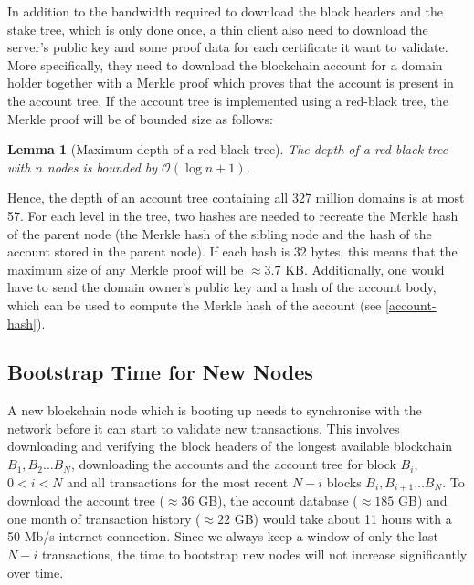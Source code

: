 \documentclass{style/kththesis}
\newtheorem{lemma}{Lemma}
\begin{document}
In addition to the bandwidth required to download the block headers and the stake tree, which is only done once, a thin client also need to download the server's public key and some proof data for each certificate it want to validate. More specifically, they need to download the blockchain account for a domain holder together with a Merkle proof which proves that the account is present in the account tree. If the account tree is implemented using a red-black tree, the Merkle proof will be of bounded size as follows: 

\begin{lemma}[Maximum depth of a red-black tree]
The depth of a red-black tree with $n$ nodes is bounded by $\mathcal{O}(\log n + 1)$.
\end{lemma}

Hence, the depth of an account tree containing all 327 million domains is at most 57. For each level in the tree, two hashes are needed to recreate the Merkle hash of the parent node (the Merkle hash of the sibling node and the hash of the account stored in the parent node). If each hash is 32 bytes, this means that the maximum size of any Merkle proof will be $\approx 3.7$ KB. Additionally, one would have to send the domain owner's public key and a hash of the account body, which can be used to compute the Merkle hash of the account (see \cref{account-hash}).

\subsection{Bootstrap Time for New Nodes}
A new blockchain node which is booting up needs to synchronise with the network before it can start to validate new transactions. This involves downloading and verifying the block headers of the longest available blockchain $B_1, B_2\ldots B_N$, downloading the accounts and the account tree for block $B_i$, $0 < i < N$ and all transactions for the most recent $N-i$ blocks $B_i, B_{i+1}\ldots B_N$. To download the account tree ($\approx 36$ GB), the account database ($\approx 185$ GB) and one month of transaction history ($\approx 22$ GB) would take about 11 hours with a 50 Mb/s internet connection. Since we always keep a window of only the last $N - i$ transactions, the time to bootstrap new nodes will not increase significantly over time.
\end{document}
